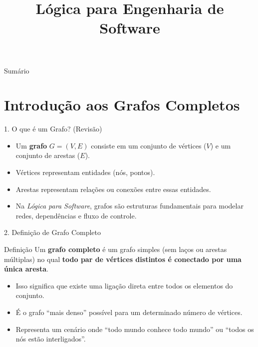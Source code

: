 \documentclass[9pt]{beamer}
\title[Presentation]{Lógica para Engenharia de Software} %
\institute[UniRV]{\textbf{\large  \textcolor{structure}{\textbf{\large
    Grafos Completos, Bipartidos e Árvores Binárias
    }}} %
    \\ \qquad
    \\Professor: Me. Sergio Souza Novak 
    \\Faculdade de Engenharia de Software}
\date{}
\begin{document}
    \begin{frame}
    \titlepage
    \end{frame}

    \begin{frame}{Sumário}
        \tableofcontents[hideallsubsections]
    \end{frame}
    \section{Introdução aos Grafos Completos}

    \begin{frame}{1. O que é um Grafo? (Revisão)}
        \begin{itemize}
            \item Um \textbf{grafo} $G = (V, E)$ consiste em um conjunto de vértices ($V$) e um conjunto de arestas ($E$).
            \item Vértices representam entidades (nós, pontos).
            \item Arestas representam relações ou conexões entre essas entidades.
            \item Na \textit{Lógica para Software}, grafos são estruturas fundamentais para modelar redes, dependências e fluxo de controle.
        \end{itemize}
        \vspace{0.5cm}
        \begin{center}
        \end{center}
    \end{frame}

    \begin{frame}{2. Definição de Grafo Completo}
        \begin{block}{Definição}
            Um \textbf{grafo completo} é um grafo simples (sem laços ou arestas múltiplas) no qual \textbf{todo par de vértices distintos é conectado por uma única aresta}.
        \end{block}
        \vspace{0.5cm}
        \begin{itemize}
            \item Isso significa que existe uma ligação direta entre todos os elementos do conjunto.
            \item É o grafo ``mais denso'' possível para um determinado número de vértices.
            \item Representa um cenário onde ``todo mundo conhece todo mundo'' ou ``todos os nós estão interligados''.
        \end{itemize}
    \end{frame}
\end{document}
